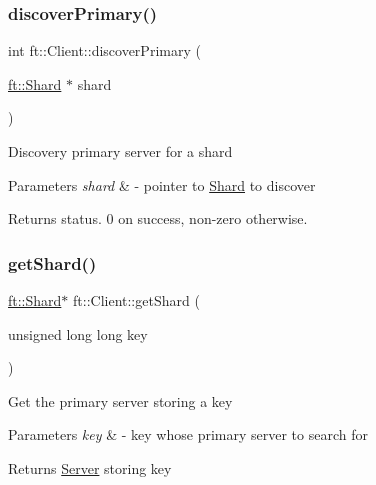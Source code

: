 \subsubsection{\texorpdfstring{discover\+Primary()}{discoverPrimary()}}
{\footnotesize\ttfamily int ft\+::\+Client\+::discover\+Primary (\begin{DoxyParamCaption}\item[{\mbox{\hyperlink{classft_1_1Shard}{ft\+::\+Shard}} $\ast$}]{shard }\end{DoxyParamCaption})}

Discovery primary server for a shard


\begin{DoxyParams}{Parameters}
{\em shard} & -\/ pointer to \mbox{\hyperlink{classft_1_1Shard}{Shard}} to discover\\
\hline
\end{DoxyParams}
\begin{DoxyReturn}{Returns}
status. 0 on success, non-\/zero otherwise. 
\end{DoxyReturn}
\mbox{\label{classft_1_1Client_ac415215bb013b2d9832fe844c5d1c07a}} 
\subsubsection{\texorpdfstring{get\+Shard()}{getShard()}}
{\footnotesize\ttfamily \mbox{\hyperlink{classft_1_1Shard}{ft\+::\+Shard}}$\ast$ ft\+::\+Client\+::get\+Shard (\begin{DoxyParamCaption}\item[{unsigned long long}]{key }\end{DoxyParamCaption})}

Get the primary server storing a key


\begin{DoxyParams}{Parameters}
{\em key} & -\/ key whose primary server to search for\\
\hline
\end{DoxyParams}
\begin{DoxyReturn}{Returns}
\mbox{\hyperlink{classft_1_1Server}{Server}} storing key 
\end{DoxyReturn}
\mbox{\label{classft_1_1Client_a063db70469c9f2715bbad637d0353680}} 
